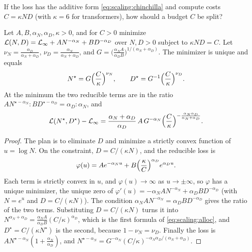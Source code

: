 \begin{refsection}
If the loss has the additive form \eqref{eq:scaling:chinchilla} and compute costs $C=\kappa ND$ (with $\kappa=6$ for transformers), how should a budget $C$ be split?

\begin{theorem}\label{thm:scaling:compute}
Let $A,B,\alpha_N,\alpha_D,\kappa>0$, and for $C>0$ minimize $\mathcal{L}(N,D)=\mathcal{L}_\infty+AN^{-\alpha_N}+BD^{-\alpha_D}$ over $N,D>0$ subject to $\kappa ND=C$. Let $\nu_N=\frac{\alpha_D}{\alpha_N+\alpha_D}$, $\nu_D=\frac{\alpha_N}{\alpha_N+\alpha_D}$, and $G=\bigl(\frac{\alpha_NA}{\alpha_DB}\bigr)^{1/(\alpha_N+\alpha_D)}$. The minimizer is unique and equals
\begin{equation}\label{eq:scaling:alloc}
  N^\star=G\Bigl(\frac C\kappa\Bigr)^{\nu_N},\qquad D^\star=G^{-1}\Bigl(\frac C\kappa\Bigr)^{\nu_D}.
\end{equation}
At the minimum the two reducible terms are in the ratio $AN^{\star-\alpha_N}:BD^{\star-\alpha_D}=\alpha_D:\alpha_N$, and
\begin{equation}\label{eq:scaling:lossC}
  \mathcal{L}(N^\star,D^\star)-\mathcal{L}_\infty=\frac{\alpha_N+\alpha_D}{\alpha_D}\,A\,G^{-\alpha_N}\Bigl(\frac C\kappa\Bigr)^{-\frac{\alpha_N\alpha_D}{\alpha_N+\alpha_D}} .
\end{equation}
\end{theorem}

\begin{proof}
The plan is to eliminate $D$ and minimize a strictly convex function of $u=\log N$. On the constraint, $D=C/(\kappa N)$, and the reducible loss is
\[
  \varphi(u)=Ae^{-\alpha_Nu}+B\Bigl(\frac\kappa C\Bigr)^{\alpha_D}e^{\alpha_Du} .
\]
Each term is strictly convex in $u$, and $\varphi(u)\to\infty$ as $u\to\pm\infty$, so $\varphi$ has a unique minimizer, the unique zero of $\varphi'(u)=-\alpha_NAN^{-\alpha_N}+\alpha_DBD^{-\alpha_D}$ (with $N=e^u$ and $D=C/(\kappa N)$). The condition $\alpha_NAN^{-\alpha_N}=\alpha_DBD^{-\alpha_D}$ gives the ratio of the two terms. Substituting $D=C/(\kappa N)$ turns it into $N^{\alpha_N+\alpha_D}=\frac{\alpha_NA}{\alpha_DB}(C/\kappa)^{\alpha_D}$, which is the first formula of \eqref{eq:scaling:alloc}, and $D^\star=C/(\kappa N^\star)$ is the second, because $1-\nu_N=\nu_D$. Finally the loss is $AN^{\star-\alpha_N}(1+\frac{\alpha_N}{\alpha_D})$, and $N^{\star-\alpha_N}=G^{-\alpha_N}(C/\kappa)^{-\alpha_N\alpha_D/(\alpha_N+\alpha_D)}$.
\end{proof}


\end{refsection}
